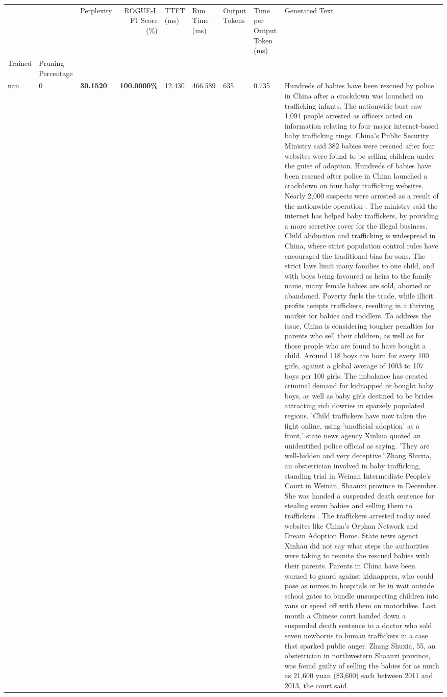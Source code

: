 \begin{table}[H]
\label{tab:evaluation-pipeline-9}
\begin{tabular}{lllrlllll}
\toprule
 &  & Perplexity & ROGUE-L F1 Score (\%) & TTFT (ms) & Run Time (ms) & Output Tokens & Time per Output Token (ms) & Generated Text \\
Trained & Pruning Percentage &  &  &  &  &  &  &  \\
\midrule
nan & 0 & \bfseries 30.1520 & \bfseries 100.0000\% & 12.430 & 466.589 & 635 & 0.735 & Hundreds of babies have been rescued by police in China after a crackdown was launched on trafficking infants. The nationwide bust saw 1,094 people arrested as officers acted on information relating to four major internet-based baby trafficking rings. China's Public Security Ministry said 382 babies were rescued after four websites were found to be selling children under the guise of adoption. Hundreds of babies have been rescued after police in China launched a crackdown on four baby trafficking websites. Nearly 2,000 suspects were arrested as a result of the nationwide operation . The ministry said the internet has helped baby traffickers, by providing a more secretive cover for the illegal business. Child abduction and trafficking is widespread in China, where strict population control rules have encouraged the traditional bias for sons. The strict laws limit many families to one child, and with boys being favoured as heirs to the family name, many female babies are sold, aborted or abandoned. Poverty fuels the trade, while illicit profits tempts traffickers, resulting in a thriving market for babies and toddlers. To address the issue, China is considering tougher penalties for parents who sell their children, as well as for those people who are found to have bought a child. Around 118 boys are born for every 100 girls, against a global average of 1003 to 107 boys per 100 girls. The imbalance has created criminal demand for kidnapped or bought baby boys, as well as baby girls destined to be brides attracting rich dowries in sparsely populated regions. 'Child traffickers have now taken the fight online, using 'unofficial adoption' as a front,' state news agency Xinhua quoted an unidentified police official as saying. 'They are well-hidden and very deceptive.' Zhang Shuxia, an obstetrician involved in baby trafficking, standing trial in Weinan Intermediate People's Court in Weinan, Shaanxi province in December. She was handed a suspended death sentence for stealing seven babies and selling them to traffickers . The traffickers arrested today used websites like China's Orphan Network and Dream Adoption Home. State news agenct Xinhau did not say what steps the authorities were taking to reunite the rescued babies with their parents. Parents in China have been warned to guard against kidnappers, who could pose as nurses in hospitals or lie in wait outside school gates to bundle unsuspecting children into vans or speed off with them on motorbikes. Last month a Chinese court handed down a suspended death sentence to a doctor who sold seven newborns to human traffickers in a case that sparked public anger. Zhang Shuxia, 55, an obstetrician in northwestern Shaanxi province, was found guilty of selling the babies for as much as 21,600 yuan (\$3,600) each between 2011 and 2013, the court said. 
\end{tabular}
\end{table}
